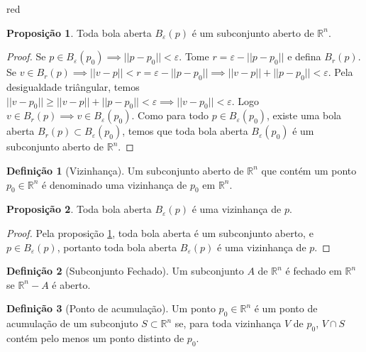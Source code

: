 \documentclass[12pt,leqno,twoside]{amsart}
\theoremstyle{definition}
\newtheorem{proposicao}{Proposição}[section]
\newtheorem{definicao}{Definição}[section]
\begin{document}
\begin{color}{red}
\vspace{0.3cm}

\begin{proposicao}
	\label{prop:bolab}
	Toda bola aberta $B_{\varepsilon}(p)$ é um subconjunto aberto de $\mathbb{R}^n$.
\end{proposicao}
\begin{proof}
	Se $p\in B_{\varepsilon}(p_0) \implies || p - p_0|| < \varepsilon$. Tome $r = \varepsilon - || p - p_0||$ e defina $B_{r} (p)$. Se $v \in B_{r}(p) \implies ||v - p|| < r = \varepsilon - || p - p_0|| \implies || v- p || + ||p-p_0|| < \varepsilon$. Pela desigualdade triângular, temos $ || v - p_0 || \geq || v- p || + ||p-p_0|| < \varepsilon \implies ||v - p_0 || < \varepsilon$. Logo $v\in B_{r}(p) \implies v\in B_{\varepsilon}(p_0)$. Como para todo $p \in B_{\varepsilon}(p_0)$, existe uma bola aberta $B_{r}(p) \subset B_{\varepsilon}(p_0)$, temos que toda bola aberta $B_{\varepsilon}(p_0)$ é um subconjunto aberto de $\mathbb{R}^{n}$.
\end{proof}

\vspace{0.3cm}

\begin{definicao}[Vizinhança]
	Um subconjunto aberto de  $\mathbb{R}^n$  que contém um ponto $p_0 \in \mathbb{R}^n$ é denominado uma vizinhança de $p_0$ em $\mathbb{R}^n$.
\end{definicao}

\vspace{0.3cm}

\begin{proposicao}
	Toda bola aberta $B_{\varepsilon}(p)$ é uma vizinhança de $p$.
\end{proposicao}
\begin{proof}
	Pela proposição \ref{prop:bolab}, toda bola aberta é um subconjunto aberto, e $p\in B_{\varepsilon}(p)$, portanto toda bola aberta $B_{\varepsilon}(p)$ é uma vizinhança de $p$.
\end{proof}

\vspace{0.3cm}

\begin{definicao}[Subconjunto Fechado]
	Um subconjunto $A$ de  $\mathbb{R}^n$  é fechado em $\mathbb{R}^n$ se $\mathbb{R}^n -A$ é aberto.
\end{definicao}

\vspace{0.3cm}

\begin{definicao}[Ponto de acumulação]
	Um ponto  $p_0 \in \mathbb{R}^n$  é um ponto de acumulação de um subconjuto $S\subset \mathbb{R}^n$ se, para toda vizinhança $V$ de $p_0$, $V\cap S$ contém pelo menos um ponto distinto de $p_0$.
\end{definicao}


\end{color}
\end{document}
